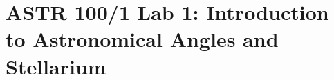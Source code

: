 \documentclass[main.tex]{subfiles}
\begin{document}
\section*{ASTR 100/1 Lab 1: Introduction to Astronomical Angles and Stellarium}
\end{document}
